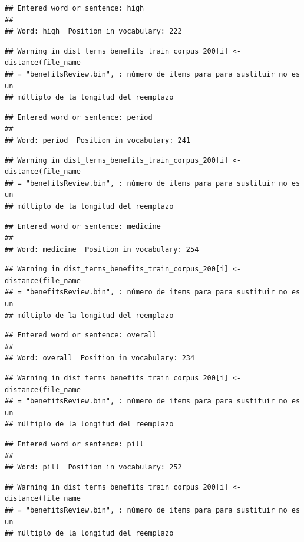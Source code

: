 \documentclass[spanish,]{article}
\begin{document}
\begin{verbatim}
## Entered word or sentence: high
## 
## Word: high  Position in vocabulary: 222
\end{verbatim}

\begin{verbatim}
## Warning in dist_terms_benefits_train_corpus_200[i] <- distance(file_name
## = "benefitsReview.bin", : número de items para para sustituir no es un
## múltiplo de la longitud del reemplazo
\end{verbatim}

\begin{verbatim}
## Entered word or sentence: period
## 
## Word: period  Position in vocabulary: 241
\end{verbatim}

\begin{verbatim}
## Warning in dist_terms_benefits_train_corpus_200[i] <- distance(file_name
## = "benefitsReview.bin", : número de items para para sustituir no es un
## múltiplo de la longitud del reemplazo
\end{verbatim}

\begin{verbatim}
## Entered word or sentence: medicine
## 
## Word: medicine  Position in vocabulary: 254
\end{verbatim}

\begin{verbatim}
## Warning in dist_terms_benefits_train_corpus_200[i] <- distance(file_name
## = "benefitsReview.bin", : número de items para para sustituir no es un
## múltiplo de la longitud del reemplazo
\end{verbatim}

\begin{verbatim}
## Entered word or sentence: overall
## 
## Word: overall  Position in vocabulary: 234
\end{verbatim}

\begin{verbatim}
## Warning in dist_terms_benefits_train_corpus_200[i] <- distance(file_name
## = "benefitsReview.bin", : número de items para para sustituir no es un
## múltiplo de la longitud del reemplazo
\end{verbatim}

\begin{verbatim}
## Entered word or sentence: pill
## 
## Word: pill  Position in vocabulary: 252
\end{verbatim}

\begin{verbatim}
## Warning in dist_terms_benefits_train_corpus_200[i] <- distance(file_name
## = "benefitsReview.bin", : número de items para para sustituir no es un
## múltiplo de la longitud del reemplazo
\end{verbatim}
\end{document}
